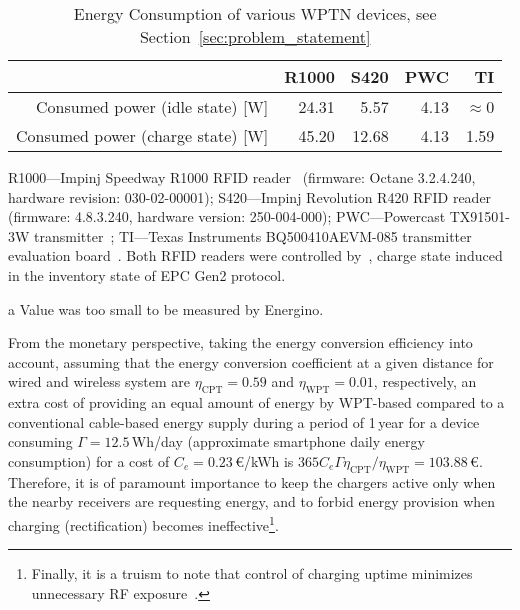 \documentclass[11pt,draftclsnofoot,journal,onecolumn]{IEEEtran}
\begin{document}
\begin{table}
\centering
\caption{Energy Consumption of various WPTN devices, see Section~\ref{sec:problem_statement}}
\label{table:wptn_energy_consumption}
\begin{threeparttable}
\scriptsize
\begin{tabular}{| r | r | r | r | r |}
\hline
~ & R1000 & S420 & PWC & TI \\
\hline\hline
Consumed power (idle state) [W] & 24.31 & 5.57 & 4.13 & $\approx$0\tnote{a}\\
\hline
Consumed power (charge state) [W] & 45.20 & 12.68 & 4.13 & 1.59\\
\hline
\end{tabular}
\begin{tablenotes}
\scriptsize \item R1000---Impinj Speedway R1000 RFID reader~\cite{r1000_data_sheet} (firmware: Octane 3.2.4.240, hardware revision: 030-02-00001); S420---Impinj Revolution R420 RFID reader~\cite{s420_data_sheet} (firmware: 4.8.3.240, hardware version: 250-004-000); PWC---Powercast TX91501-3W transmitter~\cite[/products/powercaster-transmitters]{powercast_website}; TI---Texas Instruments BQ500410AEVM-085 transmitter evaluation board~\cite[/product/bq500410a]{ti_website}. Both RFID readers were controlled by~\cite{sllrp_github}, charge state induced in the inventory state of EPC Gen2 protocol.
\item[a] Value was too small to be measured by Energino.
\end{tablenotes}
\end{threeparttable}
\end{table}

From the monetary perspective, taking the energy conversion efficiency into account, assuming that the energy conversion coefficient at a given distance for wired and wireless system are $\eta_{\text{CPT}}=0.59$ and $\eta_{\text{WPT}}=0.01$, respectively, an extra cost of providing an equal amount of energy by WPT-based compared to a conventional cable-based energy supply during a period of 1\,year for a device consuming $\Gamma=12.5$\,Wh/day (approximate smartphone daily energy consumption) for a cost of $C_e=0.23$\,\euro/kWh is $365C_e\Gamma\eta_{\text{CPT}}/\eta_{\text{WPT}}=103.88$\,\euro. Therefore, it is of paramount importance to keep the chargers active only when the nearby receivers are requesting energy, and to forbid energy provision when charging (rectification) becomes ineffective\footnote{Finally, it is a truism to note that control of charging uptime minimizes unnecessary RF exposure~\cite[Sec. IX-H]{lu_arxiv_2014}.}.
\end{document}
